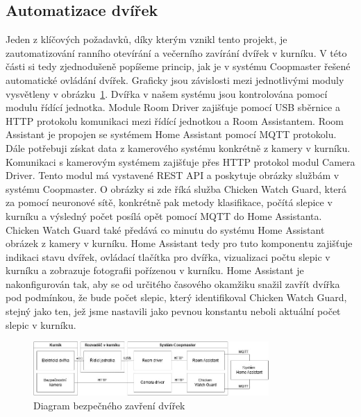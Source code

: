 \subsection{Automatizace dvířek}
Jeden z klíčových požadavků, díky kterým vznikl tento projekt, je zautomatizování ranního otevírání a večerního zavírání dvířek v kurníku.
V této části si tedy zjednodušeně popíšeme princip, jak je v systému Coopmaster řešené automatické ovládání dvířek.
Graficky jsou závislosti mezi jednotlivými moduly vysvětleny v obrázku~\ref{fig:automatizace_dvirek}.\newline
Dvířka v našem systému jsou kontrolována pomocí modulu řídící jednotka.
Module Room Driver zajišťuje pomocí USB sběrnice a HTTP protokolu komunikaci mezi řídící jednotkou a Room Assistantem.
Room Assistant je propojen se systémem Home Assistant pomocí MQTT protokolu.
Dále potřebuji získat data z kamerového systému konkrétně z kamery v kurníku.
Komunikaci s kamerovým systémem zajišťuje přes HTTP protokol modul Camera Driver.
Tento modul má vystavené REST API a poskytuje obrázky službám v systému Coopmaster.
O obrázky si zde říká služba Chicken Watch Guard, která za pomocí neuronové sítě, konkrétně pak metody klasifikace, počítá slepice v kurníku a výsledný počet posílá opět pomocí MQTT do Home Assistanta.
Chicken Watch Guard také předává co minutu do systému Home Assistant obrázek z kamery v kurníku.
Home Assistant tedy pro tuto komponentu zajišťuje indikaci stavu dvířek, ovládací tlačítka pro dvířka, vizualizaci počtu slepic v kurníku a zobrazuje fotografii pořízenou v kurníku.
Home Assistant je nakonfigurován tak, aby se od určitého časového okamžiku snažil zavřít dvířka pod podmínkou, že bude počet slepic, který identifikoval Chicken Watch Guard, stejný jako ten, jež jsme nastavili jako pevnou konstantu neboli aktuální počet slepic v kurníku.
\begin{figure}[h]
    \centering
    \includegraphics[width=0.8\textwidth]{img/automatizace_dvirek}
    \caption{Diagram bezpečného zavření dvířek}
    \label{fig:automatizace_dvirek}
\end{figure}

